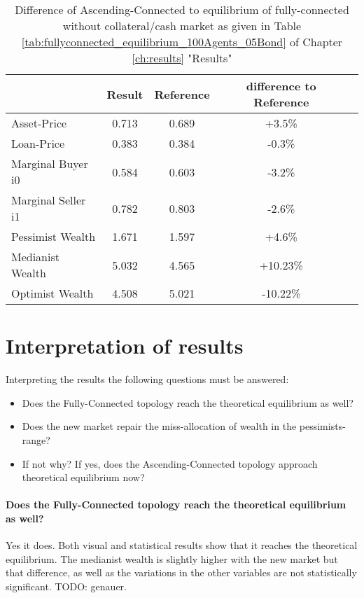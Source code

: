 \documentclass[Bachelorarbeit.tex]{subfiles}
\begin{document}
\begin{table}[H]
	\caption{Difference of Ascending-Connected to equilibrium of fully-connected without collateral/cash market as given in Table \ref{tab:fullyconnected_equilibrium_100Agents_05Bond} of Chapter \ref{ch:results} "Results"}
	\centering
	\begin{tabular} { l c c c r }
		& Result & Reference & difference to Reference \\
		\hline
		Asset-Price & 0.713 & 0.689 & +3.5\% \\
		Loan-Price & 0.383 & 0.384 & -0.3\% \\
		Marginal Buyer i0 & 0.584 & 0.603 & -3.2\% \\
		Marginal Seller i1 & 0.782 & 0.803 & -2.6\% \\
		\hline
		Pessimist Wealth & 1.671 & 1.597 & +4.6\% \\
		Medianist Wealth & 5.032 & 4.565 & +10.23\% \\
		Optimist Wealth & 4.508 & 5.021 & -10.22\% \\
		\hline
	\end{tabular}
\end{table} 

\section{Interpretation of results}
Interpreting the results the following questions must be answered:

\begin{itemize}
\item Does the Fully-Connected topology reach the theoretical equilibrium as well?
\item Does the new market repair the miss-allocation of wealth in the pessimists-range?
\item If not why? If yes, does the Ascending-Connected topology approach theoretical equilibrium now?
\end{itemize}

\paragraph{Does the Fully-Connected topology reach the theoretical equilibrium as well?}
Yes it does. Both visual and statistical results show that it reaches the theoretical equilibrium. The medianist wealth is slightly higher with the new market but that difference, as well as the variations in the other variables are not statistically significant. TODO: genauer.
\end{document}
